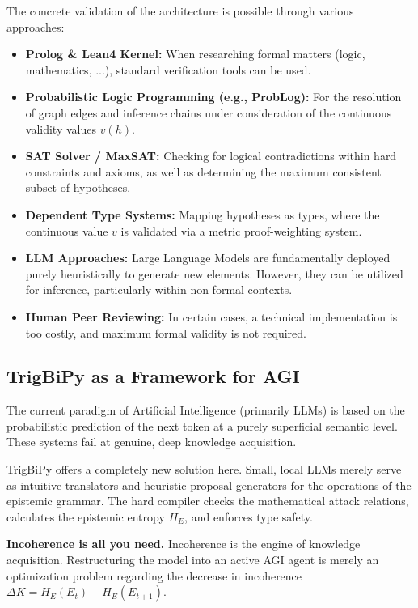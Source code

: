 \documentclass[11pt, a4paper]{article}
\begin{document}
	The concrete validation of the architecture is possible through various approaches:
	\begin{itemize}
		\item \textbf{Prolog \& Lean4 Kernel:} When researching formal matters (logic, mathematics, ...), standard verification tools can be used.
		\item \textbf{Probabilistic Logic Programming (e.g., ProbLog):} For the resolution of graph edges and inference chains under consideration of the continuous validity values $v(h)$.
		\item \textbf{SAT Solver / MaxSAT:} Checking for logical contradictions within hard constraints and axioms, as well as determining the maximum consistent subset of hypotheses.
		\item \textbf{Dependent Type Systems:} Mapping hypotheses as types, where the continuous value $v$ is validated via a metric proof-weighting system.
		\item \textbf{LLM Approaches:} Large Language Models are fundamentally deployed purely heuristically to generate new elements. However, they can be utilized for inference, particularly within non-formal contexts.
		\item \textbf{Human Peer Reviewing:} In certain cases, a technical implementation is too costly, and maximum formal validity is not required.
	\end{itemize}
	
	\subsection{TrigBiPy as a Framework for AGI}
	The current paradigm of Artificial Intelligence (primarily LLMs) is based on the probabilistic prediction of the next token at a purely superficial semantic level. These systems fail at genuine, deep knowledge acquisition.
	
	TrigBiPy offers a completely new solution here. Small, local LLMs merely serve as intuitive translators and heuristic proposal generators for the operations of the epistemic grammar. The hard compiler checks the mathematical attack relations, calculates the epistemic entropy $H_E$, and enforces type safety. 
	
	\textbf{Incoherence is all you need.} Incoherence is the engine of knowledge acquisition. Restructuring the model into an active AGI agent is merely an optimization problem regarding the decrease in incoherence $\Delta K = H_E(E_t) - H_E(E_{t+1})$.
	
\end{document}

